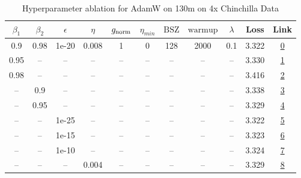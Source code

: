 \begin{table}[H]
\centering
\caption{Hyperparameter ablation for AdamW on 130m on 4x Chinchilla Data}
\label{tab:ablation_adamw_130m_on_4x_chinchilla_data}
\begin{tabular}{ccccccccccc}
\toprule
$\beta_1$ & $\beta_2$ & $\epsilon$ & $\eta$ & $g_{\mathrm{norm}}$ & $\eta_{min}$ & $\mathrm{BSZ}$ & $\mathrm{warmup}$ & $\lambda$ & Loss & Link \\
\midrule
0.9 & 0.98 & 1e-20 & 0.008 & 1 & 0 & 128 & 2000 & 0.1 & 3.322 & \href{https://wandb.ai/marin-community/optimizer-scaling/runs/sweep-130m-10B-adamw28a1ddlr0.008-wd0.1-minlr0-warmup2000-b10.9--a5a31c}{0} \\
\midrule
0.95 & -- & -- & -- & -- & -- & -- & -- & -- & 3.330 & \href{https://wandb.ai/marin-community/optimizer-scaling/runs/sweep-130m-10B-adamw3cefb4lr0.008-wd0.1-minlr0-warmup2000-b10.95-d2de07}{1} \\
0.98 & -- & -- & -- & -- & -- & -- & -- & -- & 3.416 & \href{https://wandb.ai/marin-community/optimizer-scaling/runs/sweep-130m-10B-adamwdec095lr0.008-wd0.1-minlr0-warmup2000-b10.98-5164f7}{2} \\
-- & 0.9 & -- & -- & -- & -- & -- & -- & -- & 3.338 & \href{https://wandb.ai/marin-community/optimizer-scaling/runs/sweep-130m-10B-adamw50c768lr0.008-wd0.1-minlr0-warmup2000-b10.9--374622}{3} \\
-- & 0.95 & -- & -- & -- & -- & -- & -- & -- & 3.329 & \href{https://wandb.ai/marin-community/optimizer-scaling/runs/sweep-130m-10B-adamw41da7flr0.008-wd0.1-minlr0-warmup2000-b10.9--e79638}{4} \\
-- & -- & 1e-25 & -- & -- & -- & -- & -- & -- & 3.322 & \href{https://wandb.ai/marin-community/optimizer-scaling/runs/sweep-130m-10B-adamw11bb27lr0.008-wd0.1-minlr0-warmup2000-b10.9--112190}{5} \\
-- & -- & 1e-15 & -- & -- & -- & -- & -- & -- & 3.323 & \href{https://wandb.ai/marin-community/optimizer-scaling/runs/sweep-130m-10B-adamw2151b5lr0.008-wd0.1-minlr0-warmup2000-b10.9--8b96e9}{6} \\
-- & -- & 1e-10 & -- & -- & -- & -- & -- & -- & 3.324 & \href{https://wandb.ai/marin-community/optimizer-scaling/runs/sweep-130m-10B-adamwc59aaalr0.008-wd0.1-minlr0-warmup2000-b10.9--64f3e7}{7} \\
-- & -- & -- & 0.004 & -- & -- & -- & -- & -- & 3.329 & \href{https://wandb.ai/marin-community/optimizer-scaling/runs/sweep-130m-10B-adamw05a8e1lr0.004-wd0.1-minlr0-warmup2000-b10.9--765ae0}{8} \\

\end{tabular}
\end{table}

